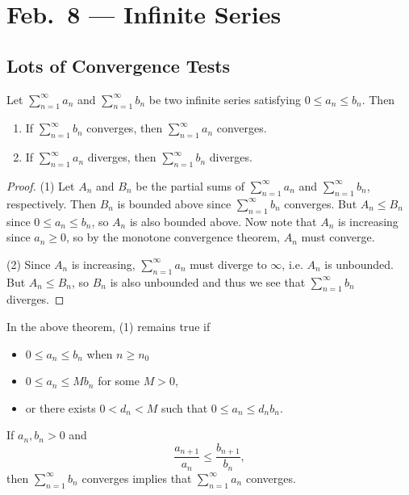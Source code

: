 \chapter{Feb.~8 --- Infinite Series}

\section{Lots of Convergence Tests}
\begin{theorem}
  Let $\sum_{n = 1}^\infty a_n$ and $\sum_{n = 1}^\infty b_n$ be two infinite series satisfying
  $0 \le a_n \le b_n$. Then
  \begin{enumerate}
    \item If $\sum_{n = 1}^\infty b_n$ converges, then $\sum_{n = 1}^\infty a_n$ converges.
    \item If $\sum_{n = 1}^\infty a_n$ diverges,
      then $\sum_{n = 1}^\infty b_n$ diverges.
  \end{enumerate}
\end{theorem}

\begin{proof}
  (1) Let $A_n$ and $B_n$ be the partial sums of
  $\sum_{n = 1}^\infty a_n$ and $\sum_{n = 1}^\infty b_n$, respectively.
  Then $B_n$ is bounded above since $\sum_{n = 1}^\infty b_n$ converges.
  But $A_n \le B_n$ since $0 \le a_n \le b_n$,
  so $A_n$ is also bounded above.
  Now note that $A_n$ is increasing since $a_n \ge 0$,
  so by the monotone convergence theorem,
  $A_n$ must converge.

  (2) Since $A_n$ is increasing,
  $\sum_{n = 1}^\infty a_n$ must diverge to $\infty$,
  i.e. $A_n$ is unbounded. But $A_n \le B_n$,
  so $B_n$ is also unbounded and thus we see that
  $\sum_{n = 1}^\infty b_n$ diverges.
\end{proof}

\begin{remark}
  In the above theorem, (1) remains true if
  \begin{itemize}
    \item $0 \le a_n \le b_n$ when $n \ge n_0$
    \item $0 \le a_n \le Mb_n$ for some $M > 0$,
    \item or there exists $0 < d_n < M$ such that
      $0 \le a_n \le d_n b_n$.
  \end{itemize}
\end{remark}

\begin{corollary}
  If $a_n, b_n > 0$ and
  \[
    \frac{a_{n + 1}}{a_n} \le \frac{b_{n + 1}}{b_n},
  \]
  then $\sum_{n = 1}^\infty b_n$ converges implies
  that $\sum_{n = 1}^\infty a_n$ converges.
\end{corollary}

